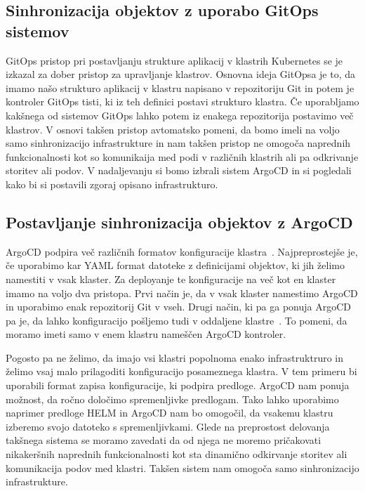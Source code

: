 \documentclass[a4paper, 12pt]{book}
\begin{document}
\subsection{Sinhronizacija objektov z uporabo GitOps sistemov}
GitOps pristop pri postavljanju strukture aplikacij v klastrih Kubernetes se je izkazal za dober pristop za upravljanje klastrov.
Osnovna ideja GitOpsa je to, da imamo našo strukturo aplikacij v klastru napisano v repozitoriju Git in potem je kontroler GitOps tisti, ki iz teh definici postavi strukturo klastra.
Če uporabljamo kakšnega od sistemov GitOps lahko potem iz enakega repozitorija postavimo več klastrov.
V osnovi takšen pristop avtomatsko pomeni, da bomo imeli na voljo samo sinhronizacijo infrastrukture in nam takšen pristop ne omogoča naprednih funkcionalnosti kot so komunikaija med podi v različnih klastrih ali pa odkrivanje storitev ali podov.
V nadaljevanju si bomo izbrali sistem ArgoCD in si pogledali kako bi si postavili zgoraj opisano infrastrukturo.
\subsection{Postavljanje sinhronizacija objektov z ArgoCD}
ArgoCD podpira več različnih formatov konfiguracije klastra~\cite{argocd-docs}.
Najpreprostejše je, če uporabimo kar YAML format datoteke z definicijami objektov, ki jih želimo namestiti v vsak klaster.
Za deployanje te konfiguracije na več kot en klaster imamo na voljo dva pristopa.
Prvi način je, da v vsak klaster namestimo ArgoCD in uporabimo enak repozitorij Git v vseh.
Drugi način, ki pa ga ponuja ArgoCD pa je, da lahko konfiguracijo pošljemo tudi v oddaljene klastre~\cite{declarative-setup}. To pomeni, da moramo imeti samo v enem klastru nameščen ArgoCD kontroler.

Pogosto pa ne želimo, da imajo vsi klastri popolnoma enako infrastruktruro in želimo vsaj malo prilagoditi konfiguracijo posameznega klastra.
V tem primeru bi uporabili format zapisa konfiguracije, ki podpira predloge.
ArgoCD nam ponuja možnost, da ročno določimo spremenljivke predlogam.
Tako lahko uporabimo naprimer predloge HELM in ArgoCD nam bo omogočil, da vsakemu klastru izberemo svojo datoteko s spremenljivkami.
Glede na preprostost delovanja takšnega sistema se moramo zavedati da od njega ne moremo pričakovati nikakeršnih naprednih funkcionalnosti kot sta dinamično odkirvanje storitev ali komunikacija podov med klastri.
Takšen sistem nam omogoča samo sinhronizacijo infrastrukture.
\end{document}
